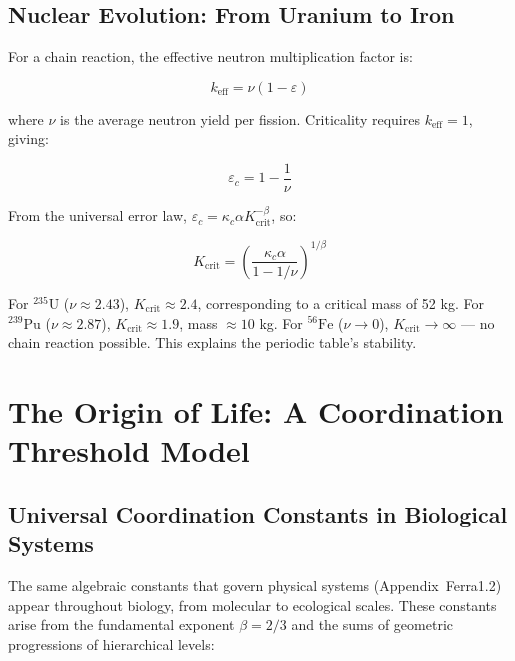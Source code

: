\documentclass[12pt,a4paper]{article}
\theoremstyle{remark}
\newcommand{\kappac}{\kappa_c}
\newcommand{\eps}{\varepsilon}
\begin{document}
	\subsection{Nuclear Evolution: From Uranium to Iron}
	\label{subsec:nuclear}
	
	For a chain reaction, the effective neutron multiplication factor is:
	
	\begin{equation}
		k_{\text{eff}} = \nu (1 - \eps)
		\label{eq:keff-nuclear}
	\end{equation}
	
	where $\nu$ is the average neutron yield per fission. Criticality requires $k_{\text{eff}} = 1$, giving:
	
	\begin{equation}
		\eps_c = 1 - \frac{1}{\nu}
		\label{eq:eps-c-nuclear}
	\end{equation}
	
	From the universal error law, $\eps_c = \kappac \alpha K_{\text{crit}}^{-\beta}$, so:
	
	\begin{equation}
		K_{\text{crit}} = \left( \frac{\kappac \alpha}{1 - 1/\nu} \right)^{1/\beta}
		\label{eq:Kcrit-nuclear}
	\end{equation}
	
	For $^{235}\text{U}$ ($\nu \approx 2.43$), $K_{\text{crit}} \approx 2.4$, corresponding to a critical mass of 52 kg. For $^{239}\text{Pu}$ ($\nu \approx 2.87$), $K_{\text{crit}} \approx 1.9$, mass $\approx 10$ kg. For $^{56}\text{Fe}$ ($\nu \to 0$), $K_{\text{crit}} \to \infty$ — no chain reaction possible. This explains the periodic table's stability.
	
	\section{The Origin of Life: A Coordination Threshold Model}
	\label{sec:origin-life}
	
	\subsection{Universal Coordination Constants in Biological Systems}
	\label{subsec:bio-constants}
	
	The same algebraic constants that govern physical systems (Appendix~Ferra1.2) appear throughout biology, from molecular to ecological scales. These constants arise from the fundamental exponent \(\beta = 2/3\) and the sums of geometric progressions of hierarchical levels:
	
\end{document}
